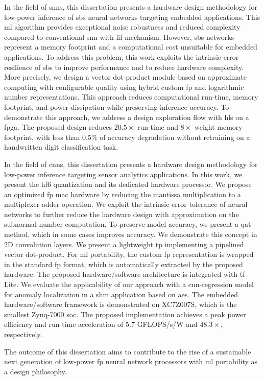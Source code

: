 In the field of \glspl{snn}, this dissertation presents a hardware design methodology for low-power inference of \gls{sbs} neural networks targeting embedded applications. This \gls{ml} algorithm provides exceptional noise robustness and reduced complexity compared to conventional \gls{snn} with \gls{lif} mechanism. However, \gls{sbs} networks represent a memory footprint and a computational cost unsuitable for embedded applications. To address this problem, this work exploits the intrinsic error resilience of \gls{sbs} to improve performance and to reduce hardware complexity. More precisely, we design a vector dot-product module based on approximate computing with configurable quality using hybrid custom \gls{fp} and logarithmic number representations. This approach reduces computational run-time, memory footprint, and power dissipation while preserving inference accuracy. To demonstrate this approach, we address a design exploration flow with \gls{hls} on a \gls{fpga}. The proposed design reduces $20.5\times$ run-time and $8\times$ weight memory footprint, with less than $0.5\%$ of accuracy degradation without retraining on a handwritten digit classification task.

In the field of \glspl{cnn}, this dissertation presents a hardware design methodology for low-power inference targeting sensor analytics applications. In this work, we present the \gls{hf6} quantization and its dedicated hardware processor. We propose an optimized \gls{fp} \gls{mac} hardware by reducing the mantissa multiplication to a multiplexer-adder operation. We exploit the intrinsic error tolerance of neural networks to further reduce the hardware design with approximation on the subnormal number computation. To preserve model accuracy, we present a \gls{qat} method, which in some cases improves accuracy. We demonstrate this concept in 2D convolution layers. We present a lightweight \gls{tp} implementing a pipelined vector dot-product. For \gls{ml} portability, the custom \gls{fp} representation is wrapped in the standard \gls{fp} format, which is automatically extracted by the proposed hardware. The proposed hardware/software architecture is integrated with \gls{tf} Lite. We evaluate the applicability of our approach with a \gls{cnn}-regression model for anomaly localization in a \gls{shm} application based on \glspl{ae}. The embedded hardware/software framework is demonstrated on XC7Z007S, which is the smallest Zynq-7000 \gls{soc}. The proposed implementation achieves a peak power efficiency and run-time acceleration of $5.7$ GFLOPS/s/W and $48.3\times$, respectively.

The outcome of this dissertation aims to contribute to the rise of a sustainable next generation of low-power \gls{fp} neural network processors with \gls{ml} portability as a design philosophy.